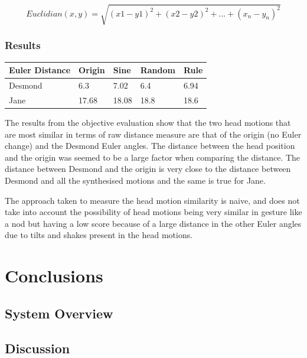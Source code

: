 \documentclass[bsc,frontabs,twoside,singlespacing,parskip]{infthesis}
\begin{document}
$$ Euclidian(x,y) = \sqrt{(x1 - y1)^2 + (x2 - y2)^2 + ... + (x_n - y_n)^2}$$

\subsection{Results}

\begin{table}[h]
\begin{tabular}{lllll}
\hline
Euler Distance & Origin & Sine  & Random & Rule   \\ \hline
Desmond        & 6.3    & 7.02  & 6.4    & 6.94   \\
Jane           & 17.68  & 18.08 & 18.8   & 18.6 \\ \hline
\end{tabular}
\end{table}

The results from the objective evaluation show that the two head motions that are most similar in terms of raw distance measure are that of the origin (no Euler change) and the Desmond Euler angles. The distance between the head position and the origin was seemed to be a large factor when comparing the distance. The distance between Desmond and the origin is very close to the distance between Desmond and all the synthesised motions and the same is true for Jane. 

The approach taken to measure the head motion similarity is naive, and does not take into account the possibility of head motions being very similar in gesture like a nod but having a low score because of a large distance in the other Euler angles due to tilts and shakes present in the head motions.




\chapter{Conclusions}



\section{System Overview}

\section{Discussion}
\end{document}
